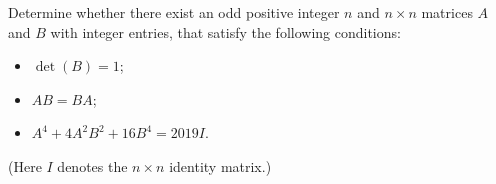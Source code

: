 Determine whether there exist an odd positive integer \(n\) and \(n\times n\) matrices \(A\) and \(B\) with integer entries, that satisfy the following conditions:
\begin{itemize}
	\item \(\det (B)=1\);
	\item \(AB=BA\);
	\item \(A^4+4A^2B^2+16B^4=2019I\).
\end{itemize}
(Here \(I\) denotes the \(n\times n\) identity matrix.)

